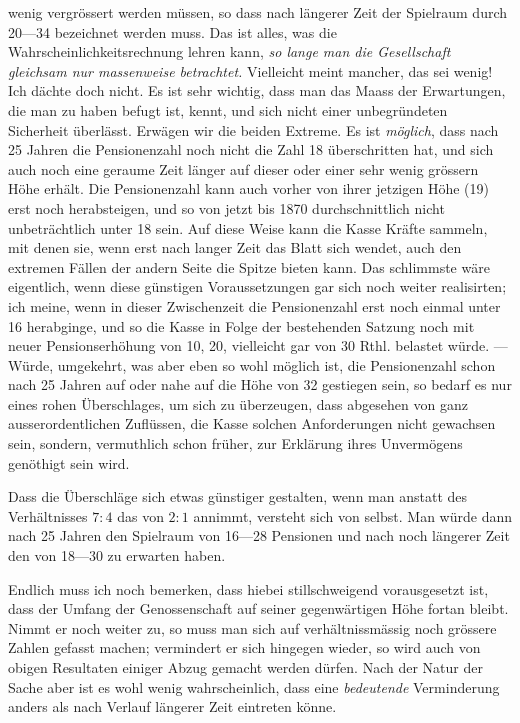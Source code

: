 wenig vergrössert werden müssen, so dass nach längerer Zeit der Spielraum durch 20—34 bezeichnet werden muss. Das ist alles, was die Wahrscheinlichkeitsrechnung lehren kann, \textit{so lange man die Gesellschaft gleichsam nur massenweise betrachtet.} Vielleicht meint mancher, das sei wenig! Ich dächte doch nicht. Es ist sehr wichtig, dass man das Maass der Erwartungen, die man zu haben befugt ist, kennt, und sich nicht einer unbegründeten Sicherheit überlässt. Erwägen wir die beiden Extreme. Es ist \textit{möglich}, dass nach 25 Jahren die Pensionenzahl noch nicht die Zahl 18 überschritten hat, und sich auch noch eine geraume Zeit länger auf dieser oder einer sehr wenig grössern Höhe erhält. Die Pensionenzahl kann auch vorher von ihrer jetzigen Höhe (19) erst noch herabsteigen, und so von jetzt bis 1870 durchschnittlich nicht unbeträchtlich unter 18 sein. Auf diese Weise kann die Kasse Kräfte sammeln, mit denen sie, wenn erst nach langer Zeit das Blatt sich wendet, auch den extremen Fällen der andern Seite die Spitze bieten kann. Das schlimmste wäre eigentlich, wenn diese günstigen Voraussetzungen gar sich noch weiter realisirten; ich meine, wenn in dieser Zwischenzeit die Pensionenzahl erst noch einmal unter 16 herabginge, und so die Kasse in Folge der bestehenden Satzung noch mit neuer Pensionserhöhung von 10, 20, vielleicht gar von 30 Rthl. belastet würde. — Würde, umgekehrt, was aber eben so wohl möglich ist, die Pensionenzahl schon nach 25 Jahren auf oder nahe auf die Höhe von 32 gestiegen sein, so bedarf es nur eines rohen Überschlages, um sich zu überzeugen, dass abgesehen von ganz ausserordentlichen Zuflüssen, die Kasse solchen Anforderungen nicht gewachsen sein, sondern, vermuthlich schon früher, zur Erklärung ihres Unvermögens genöthigt sein wird.

Dass die Überschläge sich etwas günstiger gestalten, wenn man anstatt des Verhältnisses \(7:4\) das von \(2:1\) annimmt, versteht sich von selbst. Man würde dann nach 25 Jahren den Spielraum von 16—28 Pensionen und nach noch längerer Zeit den von 18—30 zu erwarten haben.

Endlich muss ich noch bemerken, dass hiebei stillschweigend vorausgesetzt ist, dass der Umfang der Genossenschaft auf seiner gegenwärtigen Höhe fortan bleibt. Nimmt er noch weiter zu, so muss man sich auf verhältnissmässig noch grössere Zahlen gefasst machen; vermindert er sich hingegen wieder, so wird auch von obigen Resultaten einiger Abzug gemacht werden dürfen. Nach der Natur der Sache aber ist es wohl wenig wahrscheinlich, dass eine \textit{bedeutende} Verminderung anders als nach Verlauf längerer Zeit eintreten könne.

